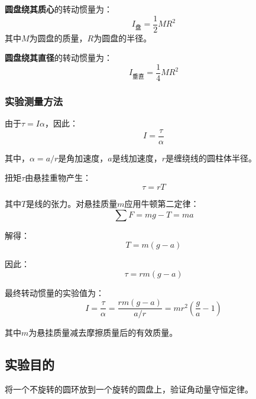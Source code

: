 \documentclass[dvipsnames, svgnames,a4paper,11pt]{article}
\begin{document}
\textbf{圆盘绕其质心}的转动惯量为：
\begin{equation}
	I_{\text{盘}} = \frac{1}{2}MR^2
\end{equation}
其中$M$为圆盘的质量，$R$为圆盘的半径。

\textbf{圆盘绕其直径}的转动惯量为：
\begin{equation}
	I_{\text{垂直}} = \frac{1}{4}MR^2
\end{equation}

\subsubsection{实验测量方法}

由于$\tau = I\alpha$，因此：
\begin{equation}
	I = \frac{\tau}{\alpha}
\end{equation}

其中，$\alpha = a/r$是角加速度，$a$是线加速度，$r$是缠绕线的圆柱体半径。

扭矩$\tau$由悬挂重物产生：
\begin{equation}
	\tau = rT
\end{equation}

其中$T$是线的张力。对悬挂质量$m$应用牛顿第二定律：
\begin{equation}
	\sum F = mg - T = ma
\end{equation}

解得：
\begin{equation}
	T = m(g - a)
\end{equation}

因此：
\begin{equation}
	\tau = rm(g-a)
\end{equation}

最终转动惯量的实验值为：
\begin{equation}
	I = \frac{\tau}{\alpha} = \frac{rm(g-a)}{a/r} = mr^2\left(\frac{g}{a}-1\right)
\end{equation}

其中$m$为悬挂质量减去摩擦质量后的有效质量。

\newpage
{}

\subsection{实验目的}
将一个不旋转的圆环放到一个旋转的圆盘上，验证角动量守恒定律。
\end{document}
